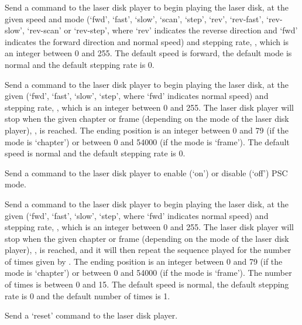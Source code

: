   Send a command to the laser disk player to begin playing the laser disk, at the given speed and
  mode (`fwd', `fast', `slow', `scan', `step', `rev', `rev-fast', `rev-slow', `rev-scan' or
  `rev-step', where `rev' indicates the reverse direction and `fwd' indicates the forward direction
  and normal speed) and stepping rate, , which is an integer between 0 and 255.
  The default speed is forward, the default mode is normal and the default stepping rate is 0.
  
  Send a command to the laser disk player to begin playing the laser disk, at the given
   (`fwd', `fast', `slow', `step', where `fwd' indicates normal speed) and stepping
  rate, , which is an integer between 0 and 255.
  The laser disk player will stop when the given chapter or frame (depending on the mode of the laser
  disk player), , is reached.
  The ending position is an integer between 0 and 79 (if the mode is `chapter') or between 0 and
  54000 (if the mode is `frame').
  The default speed is normal and the default stepping rate is 0.
  
  Send a command to the laser disk player to enable (`on') or disable (`off') PSC mode.
  
  Send a command to the laser disk player to begin playing the laser disk, at the given
   (`fwd', `fast', `slow', `step', where `fwd' indicates normal speed) and stepping
  rate, , which is an integer between 0 and 255.
  The laser disk player will stop when the given chapter or frame (depending on the mode of the laser
  disk player), , is reached, and it will then repeat the sequence played for the
  number of times given by .
  The ending position is an integer between 0 and 79 (if the mode is `chapter') or between 0 and
  54000 (if the mode is `frame').
  The number of times is between 0 and 15.
  The default speed is normal, the default stepping rate is 0 and the default number of times is 1.
  
  Send a `reset' command to the laser disk player.
  
